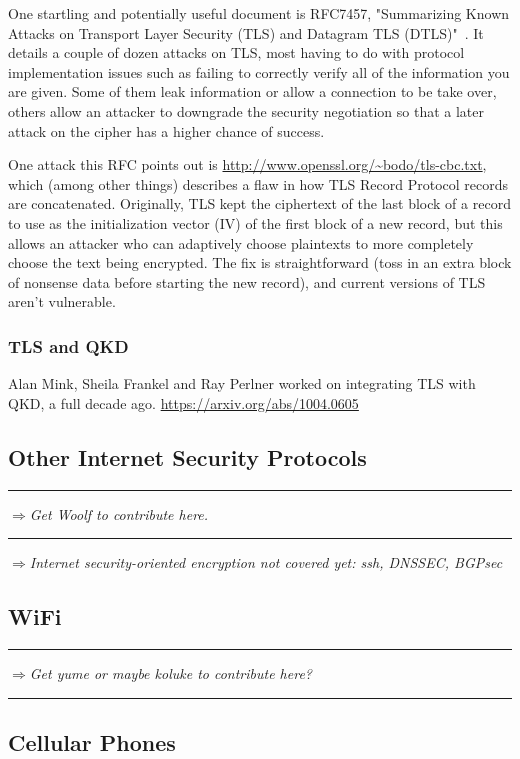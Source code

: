 \documentclass[%
 aip,
 jmp,%
 amsmath,amssymb,
 reprint,%
]{revtex4-1}
\def\outlinecomment#1{\hrule{\color{Blue}$\Rightarrow${\small\em #1}}\hrule}
\def\comment#1{{\color{ForestGreen}$\Rightarrow${\small\em #1}}}
\begin{document}
One startling and potentially useful document is RFC7457, "Summarizing
Known Attacks on Transport Layer Security (TLS) and Datagram TLS
(DTLS)"~\cite{RFC7457}.  It details a couple of dozen attacks on TLS, most having to do
with protocol implementation issues such as failing to correctly
verify all of the information you are given.  Some of them leak
information or allow a connection to be take over, others allow an
attacker to downgrade the security negotiation so that a later attack
on the cipher has a higher chance of success.

One attack this RFC points out is
\url{http://www.openssl.org/~bodo/tls-cbc.txt}, which (among other things)
describes a flaw in how TLS Record Protocol records are concatenated.
Originally, TLS kept the ciphertext of the last block of a record to
use as the initialization vector (IV) of the first block of a new
record, but this allows an attacker who can adaptively choose
plaintexts to more completely choose the text being encrypted.  The
fix is straightforward (toss in an extra block of nonsense data before
starting the new record), and current versions of TLS aren't
vulnerable.

\subsubsection{TLS and QKD}

Alan Mink, Sheila Frankel and Ray Perlner worked on integrating TLS
with QKD, a full decade ago.
\url{https://arxiv.org/abs/1004.0605}

\subsection{Other Internet Security Protocols}

\outlinecomment{Get Woolf to contribute here.}

\comment{Internet security-oriented encryption not covered yet: ssh, DNSSEC, BGPsec}

\subsection{WiFi}

\outlinecomment{Get yume or maybe koluke to contribute here?}

\subsection{Cellular Phones}
\end{document}
